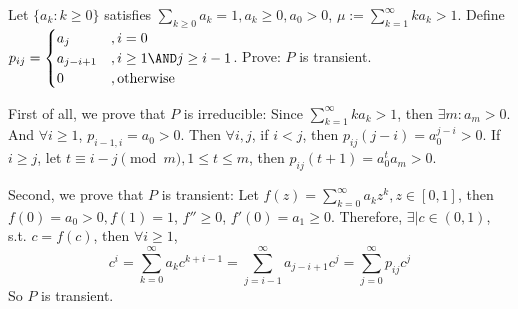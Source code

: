 \documentclass{ctexart}
\begin{document}
\begin{problem}\label{pro:8}
  Let \(\{a_k:k \geq 0\}\) satisfies \(\sum_{k \geq 0}a_k =1, a_k \geq 0, a_0 >0\), \(\mu :=\sum_{k=1}^{\infty} ka_k >1\).
  Define \(p_{ij}=
  \begin{cases}
    a_j         & , i =0                    \\
    a_{j-i + 1} & ,i \geq 1 \AND j \geq i-1 \\
    0           & ,\text{otherwise}
  \end{cases}
  \).
  Prove: \(P\) is transient.
\end{problem}
\begin{solution}
  First of all, we prove that \(P\) is irreducible: Since \(\sum_{k=1}^{\infty} ka_k > 1\), then \(\exists m : a_m >0\).
  And \(\forall i \geq 1\), \( p_{i-1,i}=a_0 >0\). Then \(\forall i,j \), if \(i < j\), then \(p_{ij}(j-i)=a_0^{j-i}>0\).
  If \(i \geq j\), let \(t \equiv i-j \pmod{m}, 1 \leq t \leq m\), then \(p_{ij}(t + 1)=a_0^{t}a_m >0\).

  Second, we prove that \(P\) is transient: Let \(f(z)=\sum_{k=0}^{\infty} a_kz^k, z \in [0,1]\),
  then \(f(0)=a_0 >0, f(1)=1\), \(f'' \geq 0\), \(f'(0)=a_1 \geq 0\).
  Therefore, \(\exists \mid c \in (0,1)\), s.t. \(c=f(c)\), then \(\forall i \geq 1\),
  \[
    c^i=\sum_{k=0}^{\infty} a_kc^{k + i-1}=\sum_{j=i-1}^{\infty} a_{j-i + 1}c^j=\sum_{j=0}^{\infty} p_{ij}c^j
  \]
  So \(P\) is transient.
\end{solution}
\end{document}
